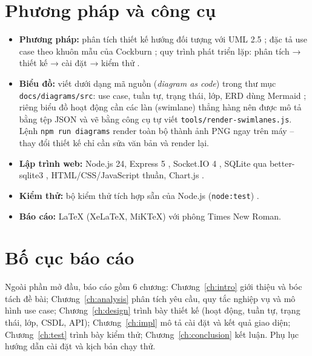 \section{Phương pháp và công cụ}
\begin{itemize}
  \item \textbf{Phương pháp:} phân tích thiết kế hướng đối tượng với UML 2.5 \cite{omg, fowler}; đặc tả use case theo khuôn mẫu của Cockburn \cite{cockburn}; quy trình phát triển lặp: phân tích → thiết kế → cài đặt → kiểm thử \cite{sommerville}.
  \item \textbf{Biểu đồ:} viết dưới dạng mã nguồn (\textit{diagram as code}) trong thư mục \texttt{docs/diagrams/src}: use case, tuần tự, trạng thái, lớp, ERD dùng Mermaid \cite{mermaid}; riêng biểu đồ hoạt động cần các làn (swimlane) thẳng hàng nên được mô tả bằng tệp JSON và vẽ bằng công cụ tự viết \texttt{tools/render-swimlanes.js}. Lệnh \texttt{npm run diagrams} render toàn bộ thành ảnh PNG ngay trên máy – thay đổi thiết kế chỉ cần sửa văn bản và render lại.
  \item \textbf{Lập trình web:} Node.js 24, Express 5 \cite{express}, Socket.IO 4 \cite{socketio}, SQLite qua better-sqlite3 \cite{sqlite, bsqlite}, HTML/CSS/JavaScript thuần, Chart.js \cite{chartjs}.
  \item \textbf{Kiểm thử:} bộ kiểm thử tích hợp sẵn của Node.js (\texttt{node:test}) \cite{nodetest}.
  \item \textbf{Báo cáo:} \LaTeX{} (XeLaTeX, MiKTeX) với phông Times New Roman.
\end{itemize}

\section{Bố cục báo cáo}
Ngoài phần mở đầu, báo cáo gồm 6 chương: Chương~\ref{ch:intro} giới thiệu và bóc tách đề bài; Chương~\ref{ch:analysis} phân tích yêu cầu, quy tắc nghiệp vụ và mô hình use case; Chương~\ref{ch:design} trình bày thiết kế (hoạt động, tuần tự, trạng thái, lớp, CSDL, API); Chương~\ref{ch:impl} mô tả cài đặt và kết quả giao diện; Chương~\ref{ch:test} trình bày kiểm thử; Chương~\ref{ch:conclusion} kết luận. Phụ lục hướng dẫn cài đặt và kịch bản chạy thử.
